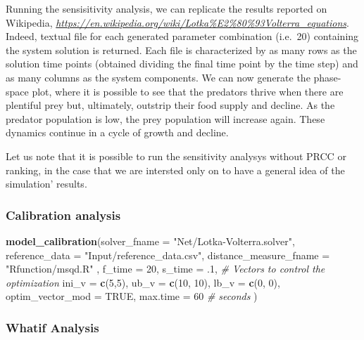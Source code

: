 \documentclass[
]{article}
\newenvironment{Shaded}{\begin{snugshade}}{\end{snugshade}}
\newcommand{\CommentTok}[1]{\textcolor[rgb]{0.56,0.35,0.01}{\textit{#1}}}
\newcommand{\DataTypeTok}[1]{\textcolor[rgb]{0.13,0.29,0.53}{#1}}
\newcommand{\DecValTok}[1]{\textcolor[rgb]{0.00,0.00,0.81}{#1}}
\newcommand{\FloatTok}[1]{\textcolor[rgb]{0.00,0.00,0.81}{#1}}
\newcommand{\KeywordTok}[1]{\textcolor[rgb]{0.13,0.29,0.53}{\textbf{#1}}}
\newcommand{\NormalTok}[1]{#1}
\newcommand{\OtherTok}[1]{\textcolor[rgb]{0.56,0.35,0.01}{#1}}
\newcommand{\StringTok}[1]{\textcolor[rgb]{0.31,0.60,0.02}{#1}}
\begin{document}
Running the sensisitivity analysis, we can replicate the results
reported on Wikipedia,
\emph{\url{https://en.wikipedia.org/wiki/Lotka\%E2\%80\%93Volterra_equations}}.
Indeed, textual file for each generated parameter combination (i.e.~20)
containing the system solution is returned. Each file is characterized
by as many rows as the solution time points (obtained dividing the final
time point by the time step) and as many columns as the system
components. We can now generate the phase-space plot, where it is
possible to see that the predators thrive when there are plentiful prey
but, ultimately, outstrip their food supply and decline. As the predator
population is low, the prey population will increase again. These
dynamics continue in a cycle of growth and decline.

Let us note that it is possible to run the sensitivity analysys without
PRCC or ranking, in the case that we are intersted only on to have a
general idea of the simulation' results.

\hypertarget{calibration-analysis}{%
\subsubsection{Calibration analysis}\label{calibration-analysis}}

\begin{Shaded}
\begin{Highlighting}[]

\KeywordTok{model_calibration}\NormalTok{(}\DataTypeTok{solver_fname =} \StringTok{"Net/Lotka-Volterra.solver"}\NormalTok{,}
                  \DataTypeTok{reference_data =} \StringTok{"Input/reference_data.csv"}\NormalTok{,}
                  \DataTypeTok{distance_measure_fname =} \StringTok{"Rfunction/msqd.R"}\NormalTok{ ,}
                  \DataTypeTok{f_time =} \DecValTok{20}\NormalTok{,}
                  \DataTypeTok{s_time =} \FloatTok{.1}\NormalTok{,}
                  \CommentTok{# Vectors to control the optimization}
                  \DataTypeTok{ini_v =} \KeywordTok{c}\NormalTok{(}\DecValTok{5}\NormalTok{,}\DecValTok{5}\NormalTok{),}
                  \DataTypeTok{ub_v =} \KeywordTok{c}\NormalTok{(}\DecValTok{10}\NormalTok{, }\DecValTok{10}\NormalTok{),}
                  \DataTypeTok{lb_v =} \KeywordTok{c}\NormalTok{(}\DecValTok{0}\NormalTok{, }\DecValTok{0}\NormalTok{),}
                  \DataTypeTok{optim_vector_mod =} \OtherTok{TRUE}\NormalTok{,}
                  \DataTypeTok{max.time =} \DecValTok{60} \CommentTok{# seconds}
\NormalTok{)}
\end{Highlighting}
\end{Shaded}

\hypertarget{whatif-analysis}{%
\subsubsection{Whatif Analysis}\label{whatif-analysis}}
\end{document}
